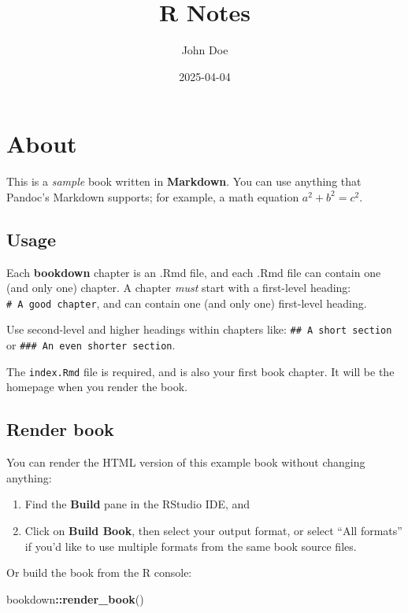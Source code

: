 \documentclass[
]{book}
\title{R Notes}
\author{John Doe}
\date{2025-04-04}
\newenvironment{Shaded}{\begin{snugshade}}{\end{snugshade}}
\newcommand{\FunctionTok}[1]{\textcolor[rgb]{0.13,0.29,0.53}{\textbf{#1}}}
\newcommand{\NormalTok}[1]{#1}
\newcommand{\SpecialCharTok}[1]{\textcolor[rgb]{0.81,0.36,0.00}{\textbf{#1}}}
\begin{document}
\maketitle

{
\setcounter{tocdepth}{1}
\tableofcontents
}
\chapter{About}\label{about}

This is a \emph{sample} book written in \textbf{Markdown}. You can use anything that Pandoc's Markdown supports; for example, a math equation \(a^2 + b^2 = c^2\).

\section{Usage}\label{usage}

Each \textbf{bookdown} chapter is an .Rmd file, and each .Rmd file can contain one (and only one) chapter. A chapter \emph{must} start with a first-level heading: \texttt{\#\ A\ good\ chapter}, and can contain one (and only one) first-level heading.

Use second-level and higher headings within chapters like: \texttt{\#\#\ A\ short\ section} or \texttt{\#\#\#\ An\ even\ shorter\ section}.

The \texttt{index.Rmd} file is required, and is also your first book chapter. It will be the homepage when you render the book.

\section{Render book}\label{render-book}

You can render the HTML version of this example book without changing anything:

\begin{enumerate}
\def\labelenumi{\arabic{enumi}.}
\item
  Find the \textbf{Build} pane in the RStudio IDE, and
\item
  Click on \textbf{Build Book}, then select your output format, or select ``All formats'' if you'd like to use multiple formats from the same book source files.
\end{enumerate}

Or build the book from the R console:

\begin{Shaded}
\begin{Highlighting}[]
\NormalTok{bookdown}\SpecialCharTok{::}\FunctionTok{render\_book}\NormalTok{()}
\end{Highlighting}
\end{Shaded}
\end{document}
